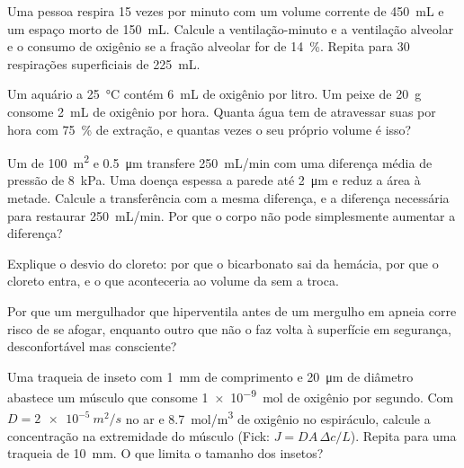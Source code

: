 \begin{exercise}[$\star\star$]\label{exo:b1:gas-exchange:5}
Uma pessoa respira \qty{15}{} vezes por minuto com um volume corrente
de \qty{450}{mL} e um espaço morto de \qty{150}{mL}. Calcule a
ventilação-minuto e a ventilação alveolar e o consumo de oxigênio se a
fração alveolar for de \qty{14}{\%}. Repita para \qty{30}{}
respirações superficiais de \qty{225}{mL}.
\end{exercise}

\begin{exercise}[$\star\star$]\label{exo:b1:gas-exchange:6}
Um aquário a \qty{25}{\celsius} contém \qty{6}{mL} de oxigênio por
litro. Um peixe de \qty{20}{g} consome \qty{2}{mL} de oxigênio por
hora. Quanta água tem de atravessar suas  por hora com
\qty{75}{\%} de extração, e quantas vezes o seu próprio volume é isso?
\end{exercise}

\begin{exercise}[$\star\star$]\label{exo:b1:gas-exchange:7}
Um  de \qty{100}{m^2} e \qty{0.5}{\micro m} transfere
\qty{250}{mL/min} com uma diferença média de pressão de \qty{8}{kPa}.
Uma doença espessa a parede até \qty{2}{\micro m} e reduz a área à
metade. Calcule a transferência com a mesma diferença, e a diferença
necessária para restaurar \qty{250}{mL/min}. Por que o corpo não pode
simplesmente aumentar a diferença?
\end{exercise}

\begin{exercise}[$\star\star$]\label{exo:b1:gas-exchange:8}
Explique o desvio do cloreto: por que o bicarbonato sai da hemácia,
por que o cloreto entra, e o que aconteceria ao volume da  sem
a troca.
\end{exercise}

\begin{exercise}[$\star\star$]\label{exo:b1:gas-exchange:9}
Por que um mergulhador que hiperventila antes de um mergulho em apneia
corre risco de se afogar, enquanto outro que não o faz volta à
superfície em segurança, desconfortável mas consciente?
\end{exercise}

\begin{exercise}[$\star\star\star$]\label{exo:b1:gas-exchange:10}
Uma traqueia de inseto com \qty{1}{mm} de comprimento e
\qty{20}{\micro m} de diâmetro abastece um músculo que consome
\qty{1e-9}{mol} de oxigênio por segundo. Com $D = \qty{2e-5}{m^2/s}$
no ar e \qty{8.7}{mol/m^3} de oxigênio no espiráculo, calcule a
concentração na extremidade do músculo (Fick:
$J = DA\,\Delta c/L$). Repita para uma traqueia de \qty{10}{mm}. O que
limita o tamanho dos insetos?
\end{exercise}

